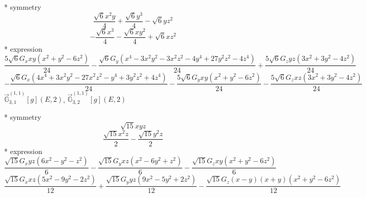\documentclass[fleqn,8pt]{jsarticle}
\begin{document}
\noindent\quad ** symmetry
\begin{dmath*}
\frac{\sqrt{6} x^{2} y}{4} + \frac{\sqrt{6} y^{3}}{4} - \sqrt{6} y z^{2}
\end{dmath*}
\begin{dmath*}
- \frac{\sqrt{6} x^{3}}{4} - \frac{\sqrt{6} x y^{2}}{4} + \sqrt{6} x z^{2}
\end{dmath*}
\noindent\quad ** expression
\begin{dmath*}
\frac{5 \sqrt{6} G_{x} x y \left(x^{2} + y^{2} - 6 z^{2}\right)}{24} - \frac{\sqrt{6} G_{y} \left(x^{4} - 3 x^{2} y^{2} - 3 x^{2} z^{2} - 4 y^{4} + 27 y^{2} z^{2} - 4 z^{4}\right)}{24} + \frac{5 \sqrt{6} G_{z} y z \left(3 x^{2} + 3 y^{2} - 4 z^{2}\right)}{24}
\end{dmath*}
\begin{dmath*}
- \frac{\sqrt{6} G_{x} \left(4 x^{4} + 3 x^{2} y^{2} - 27 x^{2} z^{2} - y^{4} + 3 y^{2} z^{2} + 4 z^{4}\right)}{24} - \frac{5 \sqrt{6} G_{y} x y \left(x^{2} + y^{2} - 6 z^{2}\right)}{24} - \frac{5 \sqrt{6} G_{z} x z \left(3 x^{2} + 3 y^{2} - 4 z^{2}\right)}{24}
\end{dmath*}
\noindent\quad $\vec{\mathbb{G}}_{3,1}^{(1,1)}[g](E,2)$, $\vec{\mathbb{G}}_{3,2}^{(1,1)}[g](E,2)$

\noindent\quad ** symmetry
\begin{dmath*}
\sqrt{15} x y z
\end{dmath*}
\begin{dmath*}
\frac{\sqrt{15} x^{2} z}{2} - \frac{\sqrt{15} y^{2} z}{2}
\end{dmath*}
\noindent\quad ** expression
\begin{dmath*}
\frac{\sqrt{15} G_{x} y z \left(6 x^{2} - y^{2} - z^{2}\right)}{6} - \frac{\sqrt{15} G_{y} x z \left(x^{2} - 6 y^{2} + z^{2}\right)}{6} - \frac{\sqrt{15} G_{z} x y \left(x^{2} + y^{2} - 6 z^{2}\right)}{6}
\end{dmath*}
\begin{dmath*}
\frac{\sqrt{15} G_{x} x z \left(5 x^{2} - 9 y^{2} - 2 z^{2}\right)}{12} + \frac{\sqrt{15} G_{y} y z \left(9 x^{2} - 5 y^{2} + 2 z^{2}\right)}{12} - \frac{\sqrt{15} G_{z} \left(x - y\right) \left(x + y\right) \left(x^{2} + y^{2} - 6 z^{2}\right)}{12}
\end{dmath*}
\end{document}
